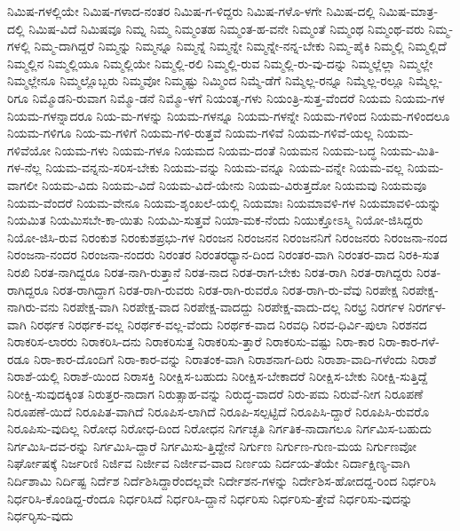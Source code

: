 {ನಿಮಿಷ-ಗಳಲ್ಲಿಯೇ
ನಿಮಿಷ-ಗಳಾದ-ನಂತರ
ನಿಮಿಷ-ಗ-ಳಿದ್ದರು
ನಿಮಿಷ-ಗಳೊ-ಳಗೇ
ನಿಮಿಷ-ದಲ್ಲಿ
ನಿಮಿಷ-ಮಾತ್ರ-ದಲ್ಲಿ
ನಿಮಿಷ-ವಿದೆ
ನಿಮಿಷವೂ
ನಿಮ್ನ
ನಿಮ್ಮ
ನಿಮ್ಮಂತಹ
ನಿಮ್ಮಂತ-ಹ-ವನೇ
ನಿಮ್ಮಂತೆ
ನಿಮ್ಮಂಥ
ನಿಮ್ಮಂಥ-ವರು
ನಿಮ್ಮ-ಗಳಲ್ಲಿ
ನಿಮ್ಮ-ದಾಗಿದ್ದರೆ
ನಿಮ್ಮನ್ನು
ನಿಮ್ಮನ್ನೂ
ನಿಮ್ಮನ್ನೆ
ನಿಮ್ಮನ್ನೇ
ನಿಮ್ಮನ್ನೇ-ನನ್ನ-ಬೇಕು
ನಿಮ್ಮ-ಪೈಕಿ
ನಿಮ್ಮಲ್ಲಿ
ನಿಮ್ಮಲ್ಲಿದೆ
ನಿಮ್ಮಲ್ಲಿನ
ನಿಮ್ಮಲ್ಲಿಯೂ
ನಿಮ್ಮಲ್ಲಿಯೇ
ನಿಮ್ಮಲ್ಲಿ-ರಲಿ
ನಿಮ್ಮಲ್ಲಿ-ರುವ
ನಿಮ್ಮಲ್ಲಿ-ರು-ವು-ದನ್ನು
ನಿಮ್ಮಲ್ಲೆಲ್ಲಾ
ನಿಮ್ಮಲ್ಲೇ
ನಿಮ್ಮಲ್ಲೇನೂ
ನಿಮ್ಮಲ್ಲೊಬ್ಬರು
ನಿಮ್ಮವೋ
ನಿಮ್ಮಷ್ಟು
ನಿಮ್ಮಿಂದ
ನಿಮ್ಮೆ-ಡೆಗೆ
ನಿಮ್ಮೆಲ್ಲ-ರನ್ನೂ
ನಿಮ್ಮೆಲ್ಲ-ರಲ್ಲೂ
ನಿಮ್ಮೆಲ್ಲ-ರಿಗೂ
ನಿಮ್ಮೊಡನಿ-ರುವಾಗ
ನಿಮ್ಮೊ-ಡನೆ
ನಿಮ್ಮೊ-ಳಗೆ
ನಿಯಂತೃ-ಗಳು
ನಿಯಂತ್ರಿ-ಸುತ್ತ-ವೆಂದರೆ
ನಿಯಮ
ನಿಯಮ-ಗಳ
ನಿಯಮ-ಗಳನ್ನಾದರೂ
ನಿಯ-ಮ-ಗಳನ್ನು
ನಿಯಮ-ಗಳನ್ನೂ
ನಿಯಮ-ಗಳನ್ನೇ
ನಿಯಮ-ಗಳಿಂದ
ನಿಯಮ-ಗಳಿಂದಲೂ
ನಿಯಮ-ಗಳಿಗೂ
ನಿಯ-ಮ-ಗಳಿಗೆ
ನಿಯಮ-ಗಳಿ-ರುತ್ತವೆ
ನಿಯಮ-ಗಳಿವೆ
ನಿಯಮ-ಗಳಿವೆ-ಯಲ್ಲ
ನಿಯಮ-ಗಳಿವೆಯೋ
ನಿಯಮ-ಗಳು
ನಿಯಮ-ಗಳೂ
ನಿಯಮದ
ನಿಯಮ-ದಂತೆ
ನಿಯಮನ
ನಿಯಮ-ಬದ್ಧ
ನಿಯಮ-ಮಿತಿ-ಗಳ-ನೆಲ್ಲ
ನಿಯಮ-ವನ್ನನು-ಸರಿಸ-ಬೇಕು
ನಿಯಮ-ವನ್ನು
ನಿಯಮ-ವನ್ನೂ
ನಿಯಮ-ವನ್ನೇ
ನಿಯಮ-ವಲ್ಲ
ನಿಯಮ-ವಾಗಲೀ
ನಿಯಮ-ವಿದು
ನಿಯಮ-ವಿದೆ
ನಿಯಮ-ವಿದೆ-ಯೇನು
ನಿಯಮ-ವಿರುತ್ತದೋ
ನಿಯಮವು
ನಿಯಮವೂ
ನಿಯಮ-ವೆಂದರೆ
ನಿಯಮ-ವೇನೂ
ನಿಯಮ-ಶೃಂಖಲೆ-ಯಲ್ಲಿ
ನಿಯಮಾಃ
ನಿಯಮಾವಳಿ-ಗಳ
ನಿಯಮಾವಳಿ-ಯನ್ನು
ನಿಯಮಿತ
ನಿಯಮಿಸಬೇ-ಕಾ-ಯಿತು
ನಿಯಮಿ-ಸುತ್ತವೆ
ನಿಯಾ-ಮಕ-ನೆಂದು
ನಿಯುಕ್ತೋಽಸ್ಮಿ
ನಿಯೋ-ಜಿಸಿದ್ದರು
ನಿಯೋ-ಜಿಸಿ-ರುವ
ನಿರಂಕುಶ
ನಿರಂಕುಶಪ್ರಭು-ಗಳ
ನಿರಂಜನ
ನಿರಂಜನನ
ನಿರಂಜನನಿಗೆ
ನಿರಂಜನರು
ನಿರಂಜನಾ-ನಂದ
ನಿರಂಜನಾ-ನಂದರ
ನಿರಂಜನಾ-ನಂದರು
ನಿರಂತರ
ನಿರಂತರಧ್ಯಾನ-ದಿಂದ
ನಿರಂತರ-ವಾಗಿ
ನಿರಂತರ-ವಾದ
ನಿರಕಿ-ಸುತ
ನಿರಖಿ
ನಿರತ-ನಾಗಿದ್ದರೂ
ನಿರತ-ನಾಗಿ-ರುತ್ತಾನೆ
ನಿರತ-ನಾದ
ನಿರತ-ರಾಗ-ಬೇಕು
ನಿರತ-ರಾಗಿ
ನಿರತ-ರಾಗಿದ್ದರು
ನಿರತ-ರಾಗಿದ್ದರೂ
ನಿರತ-ರಾಗಿದ್ದಾಗ
ನಿರತ-ರಾಗಿ-ರುವರು
ನಿರತ-ರಾಗಿ-ರುವರೊ
ನಿರತ-ರಾಗಿ-ರು-ವೆವು
ನಿರಪೇಕ್ಷ
ನಿರಪೇಕ್ಷ-ನಾಗಿರು-ವನು
ನಿರಪೇಕ್ಷ-ವಾಗಿ
ನಿರಪೇಕ್ಷ-ವಾದ
ನಿರಪೇಕ್ಷ-ವಾದದ್ದು
ನಿರಪೇಕ್ಷ-ವಾದು-ದಲ್ಲ
ನಿರಭ್ರ
ನಿರರ್ಗಳ
ನಿರರ್ಗಳ-ವಾಗಿ
ನಿರರ್ಥಕ
ನಿರರ್ಥಕ-ವಲ್ಲ
ನಿರರ್ಥಕ-ವಲ್ಲ-ವೆಂದು
ನಿರರ್ಥಕ-ವಾದ
ನಿರವಧಿ
ನಿರವ-ಧಿರ್ವಿ-ಪುಲಾ
ನಿರಶನದ
ನಿರಾಕರಿಸ-ಲಾರರು
ನಿರಾಕರಿಸಿ-ದನು
ನಿರಾಕರಿಸುತ್ತ
ನಿರಾಕರಿಸು-ತ್ತಾರೆ
ನಿರಾಕರಿಸು-ವಷ್ಟು
ನಿರಾ-ಕಾರ
ನಿರಾ-ಕಾರ-ಗಳೆ-ರಡೂ
ನಿರಾ-ಕಾರ-ದೊಂದಿಗೆ
ನಿರಾ-ಕಾರ-ವನ್ನು
ನಿರಾತಂಕ-ವಾಗಿ
ನಿರಾಶನಾಗ-ದಿರು
ನಿರಾಶಾ-ವಾದಿ-ಗಳೆಂದು
ನಿರಾಶೆ
ನಿರಾಶೆ-ಯಲ್ಲಿ
ನಿರಾಶೆ-ಯಿಂದ
ನಿರಾಸಕ್ತಿ
ನಿರೀಕ್ಷಿಸ-ಬಹುದು
ನಿರೀಕ್ಷಿಸ-ಬೇಕಾದರೆ
ನಿರೀಕ್ಷಿಸ-ಬೇಕು
ನಿರೀಕ್ಷಿ-ಸುತ್ತಿದ್ದೆ
ನಿರೀಕ್ಷಿ-ಸುವುದಕ್ಕಿಂತ
ನಿರುತ್ತರ-ನಾದಾಗ
ನಿರುತ್ಸಾಹ-ವನ್ನು
ನಿರುದ್ಧ-ವಾದರೆ
ನಿರು-ಪಮ
ನಿರುವೆ-ನೀಗ
ನಿರೂಪಣೆ
ನಿರೂಪಣೆ-ಯಿದೆ
ನಿರೂಪಿತ-ವಾಗಿದೆ
ನಿರೂಪಿಸ-ಲಾಗಿದೆ
ನಿರೂಪಿ-ಸಲ್ಪಟ್ಟಿದೆ
ನಿರೂಪಿಸಿ-ದ್ದಾರೆ
ನಿರೂಪಿಸಿ-ರುವರೊ
ನಿರೂಪಿಸು-ವುದಿಲ್ಲ
ನಿರೋಧ
ನಿರೋಧ-ದಿಂದ
ನಿರೋಧನ
ನಿರ್ಗಚ್ಛತಿ
ನಿರ್ಗತಿಕ-ನಾದಾಗಲೂ
ನಿರ್ಗಮಿಸ-ಬಹುದು
ನಿರ್ಗಮಿಸಿ-ದವ-ರನ್ನು
ನಿರ್ಗಮಿಸಿ-ದ್ದಾರೆ
ನಿರ್ಗಮಿಸು-ತ್ತಿದ್ದೇನೆ
ನಿರ್ಗುಣ
ನಿರ್ಗುಣ-ಗುಣ-ಮಯ
ನಿರ್ಗುಣವೋ
ನಿರ್ಘೋಷಕ್ಕೆ
ನಿರ್ಜರಿಣಿ
ನಿರ್ಜಿವ
ನಿರ್ಜೀವ
ನಿರ್ಜೀವ-ವಾದ
ನಿರ್ಣಯ
ನಿರ್ದಯ-ತೆಯೇ
ನಿರ್ದಾಕ್ಷಿಣ್ಯ-ವಾಗಿ
ನಿರ್ದಿಶಾಮಿ
ನಿರ್ದಿಷ್ಟ
ನಿರ್ದೆಶ
ನಿರ್ದೆಶಿಸಿದ್ದಾರೆಂದಲ್ಲವೇ
ನಿರ್ದೇಶನ-ಗಳನ್ನು
ನಿರ್ದೇಶಿಸ-ಹೋದದ್ದ-ರಿಂದ
ನಿರ್ಧರಿಸಿ
ನಿರ್ಧರಿಸಿ-ಕೊಂಡಿದ್ದ-ರೆಂದೂ
ನಿರ್ಧರಿಸಿದೆ
ನಿರ್ಧರಿಸಿ-ದ್ದಾನೆ
ನಿರ್ಧರಿಸು
ನಿರ್ಧರಿಸು-ತ್ತೇವೆ
ನಿರ್ಧರಿಸು-ವುದನ್ನು
ನಿರ್ಧರಿೃಸು-ವುದು
}
